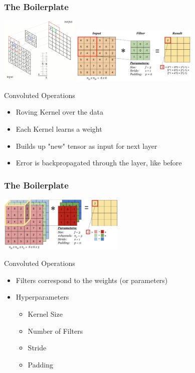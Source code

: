 \documentclass[aspectratio=169,usenames,dvipsnames]{beamer}
\begin{document}
\begin{frame}
    \frametitle{The Boilerplate}
    \centering
    \includegraphics[width=0.28\textwidth]{Figures/kernel2.png}
    \includegraphics[width=0.45\textwidth]{Figures/kernel3.png}
    \vspace{-1\baselineskip}
    \begin{block}{Convoluted Operations}
        \begin{itemize}
            \item Roving Kernel over the data
            \item Each Kernel learns a weight
            \item Builds up "new" tensor as input for next layer
            \item Error is backpropagated through the layer, like before   
        \end{itemize}    
    \end{block}
\end{frame}
\begin{frame}
    \frametitle{The Boilerplate}
    \centering
    \includegraphics[width=0.45\textwidth]{Figures/kernel4.png}
    \vspace{-1\baselineskip}
    \begin{block}{Convoluted Operations}
        \begin{itemize}
            \item Filters correspond to the weights (or parameters)
            \item Hyperparameters
            \begin{itemize}
                \item Kernel Size
                \item Number of Filters
                \item Stride
                \item Padding
            \end{itemize}    
        \end{itemize}
    \end{block}
\end{frame}
\end{document}
